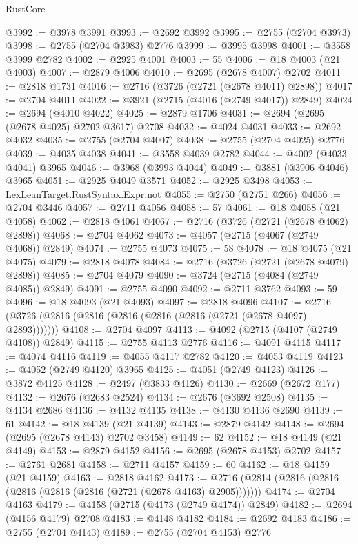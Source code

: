 \begin{lexlean}{RustCore}
\begin{coremodule}
@3992 := @3978 @3991
@3993 := @2692 @3992
@3995 := @2755 (@2704 @3973)
@3998 := @2755 (@2704 @3983) @2776
@3999 := @3995 @3998
@4001 := @3558 @3999 @2782
@4002 := @2925 @4001
@4003 := 55
@4006 := @18 @4003 (@21 @4003)
@4007 := @2879 @4006
@4010 := @2695 (@2678 @4007) @2702
@4011 := @2818 @1731
@4016 := @2716 (@3726 (@2721 (@2678 @4011) @2898))
@4017 := @2704 @4011
@4022 := @3921 (@2715 (@4016 (@2749 @4017)) @2849)
@4024 := @2694 (@4010 @4022)
@4025 := @2879 @1706
@4031 := @2694 (@2695 (@2678 @4025) @2702 @3617) @2708
@4032 := @4024 @4031
@4033 := @2692 @4032
@4035 := @2755 (@2704 @4007)
@4038 := @2755 (@2704 @4025) @2776
@4039 := @4035 @4038
@4041 := @3558 @4039 @2782
@4044 := @4002 (@4033 @4041) @3965
@4046 := @3968 (@3993 @4044)
@4049 := @3881 (@3906 @4046) @3965
@4051 := @2925 @4049 @3571
@4052 := @2925 @3498
@4053 := LexLeanTarget.RustSyntax.Expr.not
@4055 := @2750 (@2751 @266)
@4056 := @2704 @3446
@4057 := @2711 @4056
@4058 := 57
@4061 := @18 @4058 (@21 @4058)
@4062 := @2818 @4061
@4067 := @2716 (@3726 (@2721 (@2678 @4062) @2898))
@4068 := @2704 @4062
@4073 := @4057 (@2715 (@4067 (@2749 @4068)) @2849)
@4074 := @2755 @4073
@4075 := 58
@4078 := @18 @4075 (@21 @4075)
@4079 := @2818 @4078
@4084 := @2716 (@3726 (@2721 (@2678 @4079) @2898))
@4085 := @2704 @4079
@4090 := @3724 (@2715 (@4084 (@2749 @4085)) @2849)
@4091 := @2755 @4090
@4092 := @2711 @3762
@4093 := 59
@4096 := @18 @4093 (@21 @4093)
@4097 := @2818 @4096
@4107 := @2716 (@3726 (@2816 (@2816 (@2816 (@2816 (@2816 (@2721 (@2678 @4097) @2893)))))))
@4108 := @2704 @4097
@4113 := @4092 (@2715 (@4107 (@2749 @4108)) @2849)
@4115 := @2755 @4113 @2776
@4116 := @4091 @4115
@4117 := @4074 @4116
@4119 := @4055 @4117 @2782
@4120 := @4053 @4119
@4123 := @4052 (@2749 @4120) @3965
@4125 := @4051 (@2749 @4123)
@4126 := @3872 @4125
@4128 := @2497 (@3833 @4126)
@4130 := @2669 (@2672 @177)
@4132 := @2676 (@2683 @2524)
@4134 := @2676 (@3692 @2508)
@4135 := @4134 @2686
@4136 := @4132 @4135
@4138 := @4130 @4136 @2690
@4139 := 61
@4142 := @18 @4139 (@21 @4139)
@4143 := @2879 @4142
@4148 := @2694 (@2695 (@2678 @4143) @2702 @3458)
@4149 := 62
@4152 := @18 @4149 (@21 @4149)
@4153 := @2879 @4152
@4156 := @2695 (@2678 @4153) @2702
@4157 := @2761 @2681
@4158 := @2711 @4157
@4159 := 60
@4162 := @18 @4159 (@21 @4159)
@4163 := @2818 @4162
@4173 := @2716 (@2814 (@2816 (@2816 (@2816 (@2816 (@2816 (@2721 (@2678 @4163) @2905)))))))
@4174 := @2704 @4163
@4179 := @4158 (@2715 (@4173 (@2749 @4174)) @2849)
@4182 := @2694 (@4156 @4179) @2708
@4183 := @4148 @4182
@4184 := @2692 @4183
@4186 := @2755 (@2704 @4143)
@4189 := @2755 (@2704 @4153) @2776

\end{coremodule}
\end{lexlean}
